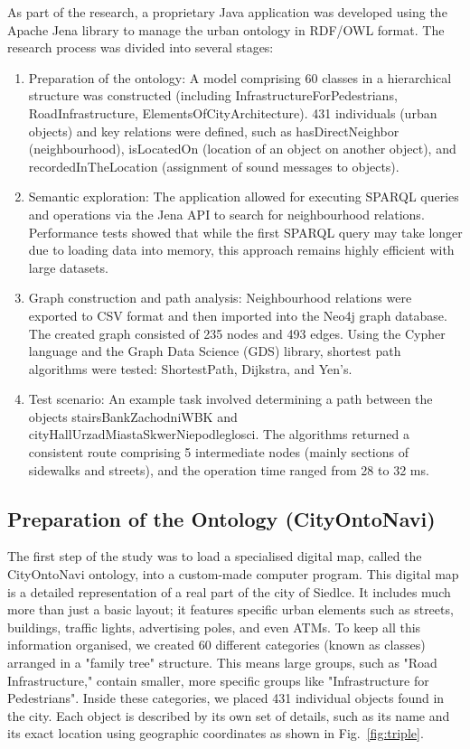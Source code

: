 \documentclass[conference]{IEEEtran}
\begin{document}
As part of the research, a proprietary Java application was developed using the Apache Jena library to manage the urban ontology in RDF/OWL format. The research process was divided into several stages:
\begin{enumerate}
\item Preparation of the ontology: A model comprising 60 classes in a hierarchical structure was constructed (including InfrastructureForPedestrians, RoadInfrastructure, ElementsOfCityArchitecture). 431 individuals (urban objects) and key relations were defined, such as hasDirectNeighbor (neighbourhood), isLocatedOn (location of an object on another object), and recordedInTheLocation (assignment of sound messages to objects).
\item Semantic exploration: The application allowed for executing SPARQL queries and operations via the Jena API to search for neighbourhood relations. Performance tests showed that while the first SPARQL query may take longer due to loading data into memory, this approach remains highly efficient with large datasets.
\item Graph construction and path analysis: Neighbourhood relations were exported to CSV format and then imported into the Neo4j graph database. The created graph consisted of 235 nodes and 493 edges. Using the Cypher language and the Graph Data Science (GDS) library, shortest path algorithms were tested: ShortestPath, Dijkstra, and Yen's.
\item Test scenario: An example task involved determining a path between the objects stairsBankZachodniWBK and cityHallUrzadMiastaSkwerNiepodleglosci.
The algorithms returned a consistent route comprising 5 intermediate nodes (mainly sections of sidewalks and streets), and the operation time ranged from 28 to 32 ms.
\end{enumerate}

\subsection{Preparation of the Ontology (CityOntoNavi)}
The first step of the study was to load a specialised digital map, called the CityOntoNavi ontology, into a custom-made computer program. This digital map is a detailed representation of a real part of the city of Siedlce. It includes much more than just a basic layout; it features specific urban elements such as streets, buildings, traffic lights, advertising poles, and even ATMs.
To keep all this information organised, we created 60 different categories (known as classes) arranged in a "family tree" structure. This means large groups, such as "Road Infrastructure," contain smaller, more specific groups like "Infrastructure for Pedestrians". Inside these categories, we placed 431 individual objects found in the city. Each object is described by its own set of details, such as its name and its exact location using geographic coordinates as shown in Fig.~\ref{fig:triple}.
\end{document}
